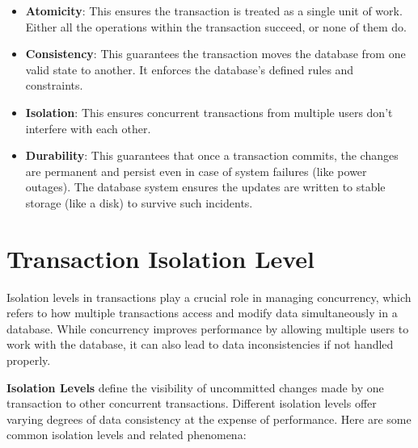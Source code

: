 \begin{itemize}
\item \textbf{Atomicity}: This ensures the transaction is treated as a single unit of work. Either all the operations within the transaction succeed, or none of them do. 

\item \textbf{Consistency}: This guarantees the transaction moves the database from one valid state to another. It enforces the database's defined rules and constraints. 

\item \textbf{Isolation}: This ensures concurrent transactions from multiple users don't interfere with each other. 

\item \textbf{Durability}: This guarantees that once a transaction commits, the changes are permanent and persist even in case of system failures (like power outages). The database system ensures the updates are written to stable storage (like a disk) to survive such incidents.
\end{itemize}

\section{Transaction Isolation Level}


Isolation levels in transactions play a crucial role in managing concurrency, which refers to how multiple transactions access and modify data simultaneously in a database. While concurrency improves performance by allowing multiple users to work with the database, it can also lead to data inconsistencies if not handled properly.

\textbf{Isolation Levels} define the visibility of uncommitted changes made by one transaction to other concurrent transactions. Different isolation levels offer varying degrees of data consistency at the expense of performance. Here are some common isolation levels and related phenomena:

